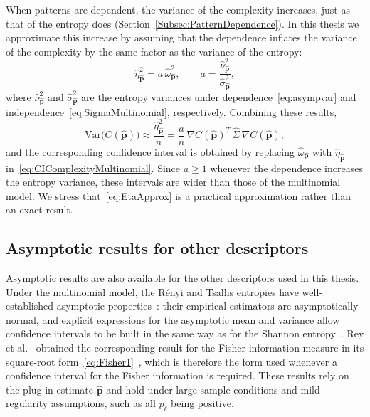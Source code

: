 When patterns are dependent, the variance of the complexity increases, just as that of the entropy does (Section~\ref{Subsec:PatternDependence}). In this thesis we approximate this increase by assuming that the dependence inflates the variance of the complexity by the same factor as the variance of the entropy:
\begin{equation}
	\widehat{\eta}^2_{\widehat{\mathbf{p}}}=a\,\widehat{\omega}^2_{\widehat{\mathbf{p}}},
	\qquad
	a=\frac{\widehat{\nu}^2_{\widehat{\mathbf{p}}}}{\widehat{\sigma}^2_{\widehat{\mathbf{p}}}},
	\label{eq:EtaApprox}
\end{equation}
where $\widehat{\nu}^2_{\widehat{\mathbf{p}}}$ and $\widehat{\sigma}^2_{\widehat{\mathbf{p}}}$ are the entropy variances under dependence~\eqref{eq:asympvar} and independence~\eqref{eq:SigmaMultinomial}, respectively. Combining these results,
\[
\mathrm{Var}\big(C(\widehat{\mathbf{p}})\big)\approx\frac{\widehat{\eta}^2_{\widehat{\mathbf{p}}}}{n}
=\frac{a}{n}\,\nabla C(\widehat{\mathbf{p}})^{T}\,\widehat{\Sigma}\,\nabla C(\widehat{\mathbf{p}}),
\]
and the corresponding confidence interval is obtained by replacing $\widehat{\omega}_{\widehat{\mathbf{p}}}$ with $\widehat{\eta}_{\widehat{\mathbf{p}}}$ in~\eqref{eq:CIComplexityMultinomial}. Since $a\geq 1$ whenever the dependence increases the entropy variance, these intervals are wider than those of the multinomial model. We stress that~\eqref{eq:EtaApprox} is a practical approximation rather than an exact result.

\subsection{Asymptotic results for other descriptors}\label{Subsec:OtherAsymptotics}

Asymptotic results are also available for the other descriptors used in this thesis. Under the multinomial model, the R\'enyi and Tsallis entropies have well-established asymptotic properties~\cite{Pardo1997,Rey2024, Rey2023}: their empirical estimators are asymptotically normal, and explicit expressions for the asymptotic mean and variance allow confidence intervals to be built in the same way as for the Shannon entropy~\cite{Pardo1997,Rey2024}. Rey et al.~\cite{Rey2024, Rey2023} obtained the corresponding result for the Fisher information measure in its square-root form~\eqref{eq:Fisher1}~\cite{Bobkov2019}, which is therefore the form used whenever a confidence interval for the Fisher information is required. These results rely on the plug-in estimate $\widehat{\mathbf{p}}$ and hold under large-sample conditions and mild regularity assumptions, such as all $p_\ell$ being positive.

